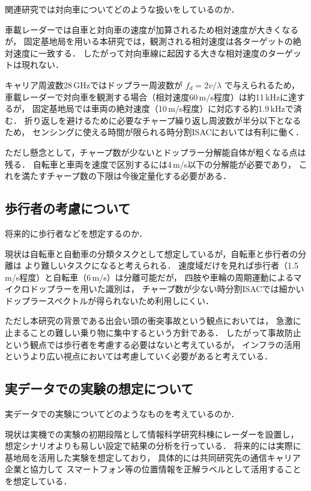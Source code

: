 \documentclass[a4paper,10.5pt,dvipdfmx]{jsarticle}
\begin{document}
関連研究では対向車についてどのような扱いをしているのか．

車載レーダーでは自車と対向車の速度が加算されるため相対速度が大きくなるが，
固定基地局を用いる本研究では，観測される相対速度は各ターゲットの絶対速度に一致する．
したがって対向車線に起因する大きな相対速度のターゲットは現れない．

キャリア周波数28\,GHzではドップラー周波数が $f_d = 2v/\lambda$ で与えられるため，
車載レーダーで対向車を観測する場合（相対速度60\,m/s程度）は約11\,kHzに達するが，
固定基地局では車両の絶対速度（10\,m/s程度）に対応する約1.9\,kHzで済む．
折り返しを避けるために必要なチャープ繰り返し周波数が半分以下となるため，
センシングに使える時間が限られる時分割ISACにおいては有利に働く．

ただし懸念として，チャープ数が少ないとドップラー分解能自体が粗くなる点は残る．
自転車と車両を速度で区別するには4\,m/s以下の分解能が必要であり，
これを満たすチャープ数の下限は今後定量化する必要がある．

\subsection{歩行者の考慮について}

将来的に歩行者などを想定するのか．

現状は自転車と自動車の分類タスクとして想定しているが，自転車と歩行者の分離は
より難しいタスクになると考えられる．
速度域だけを見れば歩行者（1.5\,m/s程度）と自転車（6\,m/s）は分離可能だが，
四肢や車輪の周期運動によるマイクロドップラーを用いた識別は，
チャープ数が少ない時分割ISACでは細かいドップラースペクトルが得られないため利用しにくい．

ただし本研究の背景である出会い頭の衝突事故という観点においては，
急激に止まることの難しい乗り物に集中するという方針である．
したがって事故防止という観点では歩行者を考慮する必要はないと考えているが，
インフラの活用というより広い視点においては考慮していく必要があると考えている．

\subsection{実データでの実験の想定について}

実データでの実験についてどのようなものを考えているのか．

現状は実機での実験の初期段階として情報科学研究科棟にレーダーを設置し，
想定シナリオよりも易しい設定で結果の分析を行っている．
将来的には実際に基地局を活用した実験を想定しており，
具体的には共同研究先の通信キャリア企業と協力して
スマートフォン等の位置情報を正解ラベルとして活用することを想定している．
\end{document}
